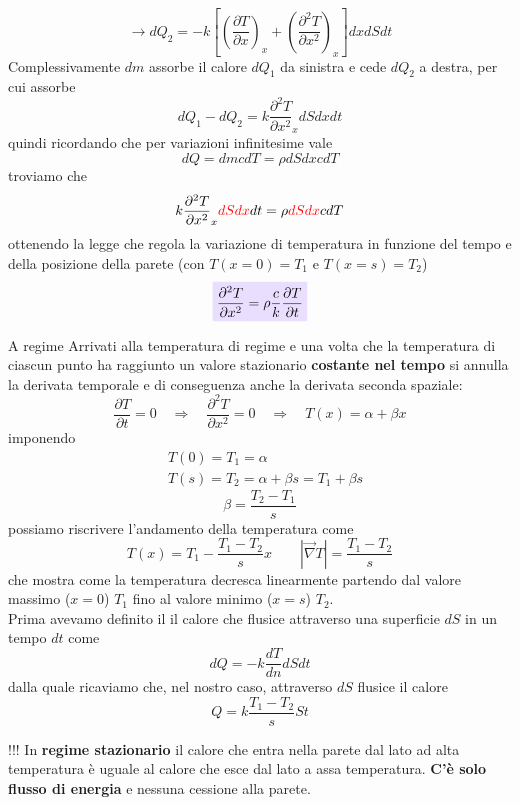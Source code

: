 \documentclass[x11names]{report}
\newcommand{\viola}[1]{\colorbox{yred}{$\displaystyle #1$}}
\begin{document}
\[ 
\to dQ_2 = -k\left[\left(\frac{\partial T}{\partial x}\right)_x + \left(\frac{\partial^2 T}{\partial x^2}\right)_{x}\right]dxdSdt
\]
Complessivamente \(dm\) assorbe il calore \(dQ_1\) da sinistra e cede \(dQ_2\) a destra, per cui assorbe 
\[ 
dQ_1 - dQ_2  = k\frac{\partial^2 T}{\partial x^2}_{x}dSdx dt
\]
quindi ricordando che per variazioni infinitesime vale
\[ 
dQ = dmcdT = \rho dS dx c dT
\]
troviamo che 
\[ 
k\frac{\partial^2 T}{\partial x^2}_{x}\textcolor{red}{dSdx} dt = \rho  \textcolor{red}{dSdx} c dT
\]
ottenendo la legge che regola la variazione di temperatura in funzione del tempo e della posizione della parete (con \(T(x=0) = T_1\) e \(T(x = s) = T_2\))
\begin{equation}
	\viola{\frac{\partial^2 T}{\partial x^2} = \rho \frac{c}{k} \frac{\partial T}{\partial t}}
\end{equation}
\begin{es}{A regime}
	Arrivati alla temperatura di regime e una volta che la temperatura di ciascun punto ha raggiunto un valore stazionario \textbf{costante nel tempo} si annulla la derivata temporale e di conseguenza anche la derivata seconda spaziale:
	\[ 
	\frac{\partial T}{\partial t} = 0 \quad \Rightarrow \quad \frac{\partial^2 T}{\partial x^2} = 0\quad \Rightarrow \quad T(x) = \alpha + \beta x
	\]
	imponendo
	\begin{align*}
		&T(0) = T_1 = \alpha  \\
		&T(s) = T_2 = \alpha + \beta s = T_1 + \beta s
	\end{align*}
	\[ 
	\beta = \frac{T_2 - T_1}{s} 
	\]
	possiamo riscrivere l'andamento della temperatura come
	\[ 
	T(x) = T_1 - \frac{T_1 - T_2}{s}x \qquad |\overrightarrow{\nabla}T |= \frac{T_1 - T_2}{s}
	\]
	che mostra come la temperatura decresca linearmente partendo dal valore massimo (\(x=0\)) \(T_1\) fino al valore minimo (\(x=s\)) \(T_2\). \\
	
	Prima avevamo definito il il calore che flusice attraverso una superficie \(dS\) in un tempo \(dt\) come
	\[ 
	dQ = -k\frac{dT}{dn}dS dt
	\]
	dalla quale ricaviamo che, nel nostro caso, attraverso \(dS\) flusice il calore 
	\[ 
	Q = k\frac{T_1 - T_2}{s}St
	\]
	\begin{center}
		\colorbox{attenzione}{\begin{minipage}{5in}
				\begin{attenzione}{!!!}
					In \textbf{regime stazionario} il calore che entra nella parete dal lato ad alta temperatura è uguale al calore che esce dal lato a assa temperatura. \textbf{C'è solo flusso di energia} e nessuna cessione alla parete.
				\end{attenzione}
		\end{minipage}}
	\end{center}
\end{es}
\end{document}
